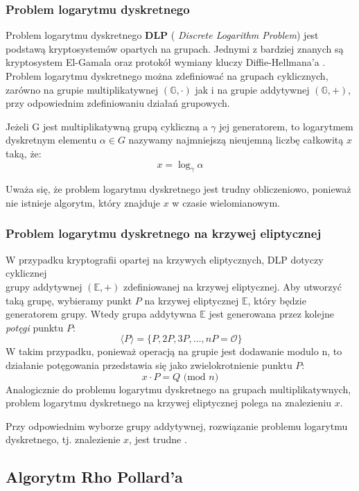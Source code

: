 \subsubsection{Problem logarytmu dyskretnego}
Problem logarytmu dyskretnego \textbf{DLP} ( \textit{Discrete Logarithm Problem})
jest podstawą kryptosystemów opartych na grupach.
Jednymi z bardziej znanych są kryptosystem El-Gamala oraz protokół wymiany
kluczy Diffie-Hellmana'a \cite{Stinson2021,Blake2005}.
Problem logarytmu dyskretnego można zdefiniować na grupach cyklicznych,
zarówno na grupie multiplikatywnej $(\mathbb{G},\cdot)$
jak i na grupie addytywnej $(\mathbb{G}, +)$, przy odpowiednim zdefiniowaniu działań grupowych.

Jeżeli G jest multiplikatywną grupą cykliczną a $\gamma$ jej generatorem, to logarytmem dyskretnym
elementu $\alpha \in G$ nazywamy najmniejszą nieujemną liczbę całkowitą $x$ taką, że:
\[x = \log_{\gamma}{\alpha}\]

Uważa się, że problem logarytmu dyskretnego jest trudny obliczeniowo, ponieważ nie istnieje
algorytm, który znajduje $x$ w czasie wielomianowym\cite{Stinson2021}.


\subsubsection{Problem logarytmu dyskretnego na krzywej eliptycznej}
W przypadku kryptografii opartej na krzywych eliptycznych, DLP dotyczy cyklicznej \\
grupy addytywnej $(\mathbb{E},+)$ zdefiniowanej na krzywej eliptycznej.
Aby utworzyć taką grupę, wybieramy punkt $P$ na krzywej eliptycznej $\mathbb{E}$,
który będzie generatorem grupy. Wtedy grupa addytywna $\mathbb{E}$ jest generowana przez
kolejne \textit{potęgi} punktu $P$:
\[\ \langle P \rangle = \{P, 2P, 3P, \ldots, nP = \mathcal{O}\}\]
W takim przypadku, ponieważ operacją na grupie jest dodawanie modulo n, to działanie
potęgowania przedstawia się jako zwielokrotnienie punktu $P$:
\[x \cdot P = Q \textrm{ (mod } n)\]
Analogicznie do problemu logarytmu dyskretnego na grupach multiplikatywnych,
problem logarytmu dyskretnego na krzywej eliptycznej polega na znalezieniu
$x$.
\par
Przy odpowiednim wyborze grupy addytywnej, rozwiązanie problemu logarytmu dyskretnego,
tj. znalezienie $x$,
jest trudne \cite{Stinson2021}.


\subsection{Algorytm Rho Pollard'a}

